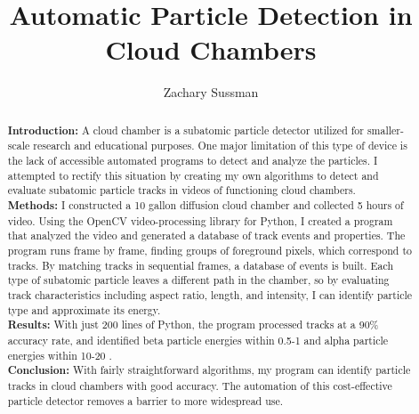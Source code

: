 \documentclass[notitlepage,12pt]{article}
\author{Zachary Sussman}
\title{Automatic Particle Detection in Cloud Chambers}
\date{}
\begin{document}
 




\maketitle

\begin{abstract}
\noindent
\textbf{Introduction:} A cloud chamber is a subatomic particle detector utilized for smaller-scale research and educational purposes.  One major limitation of this type of device is the lack of accessible automated programs to detect and analyze the particles. I attempted to rectify this situation by creating my own algorithms to detect and evaluate subatomic particle tracks in videos of functioning cloud chambers.
\\ \textbf{Methods:} I constructed a 10 gallon diffusion cloud chamber and collected 5 hours of video.  Using the OpenCV video-processing library for Python, I created a program that analyzed the video and generated a database of track events and properties. The program runs frame by frame, finding groups of foreground pixels, which correspond to tracks.  By matching tracks in sequential frames, a database of events is built. Each type of subatomic particle leaves a different path in the chamber, so by evaluating track characteristics including aspect ratio, length, and intensity, I can identify particle type and approximate its energy.
\\ \textbf{Results:} With just 200 lines of Python, the program processed tracks at a 90\% accuracy rate, and identified beta particle energies within 0.5-1 \kilo{}\electronvolt and alpha particle energies within 10-20 \kilo{}\electronvolt. 
\\ \textbf{Conclusion:} With fairly straightforward algorithms, my program can identify particle tracks in cloud chambers with good accuracy. The automation of this cost-effective particle detector removes a barrier to more widespread use.


\end{abstract}
\end{document}
